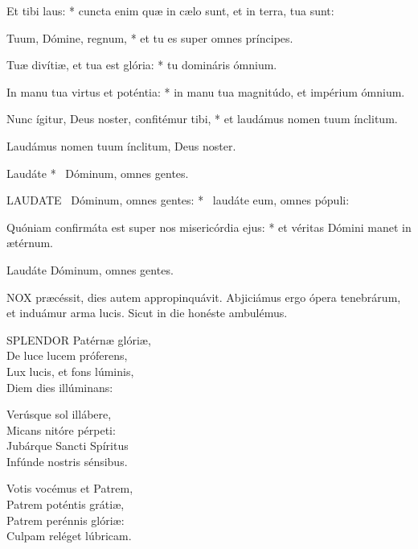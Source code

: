 Et tibi laus: * cuncta enim quæ in cælo sunt, et in terra, tua sunt:

Tuum, Dómine, regnum, * et tu es super omnes príncipes.

Tuæ divítiæ, et tua est glória: * tu domináris ómnium.

In manu tua virtus et poténtia: * in manu tua magnitúdo, et impérium ómnium.

Nunc ígitur, Deus noster, confitémur tibi, * et laudámus nomen tuum ínclitum.

 Laudámus nomen tuum ínclitum, Deus noster.

 Laudáte * \textdagger\ Dóminum, omnes gentes. \textdaggerdbl


\lettrine[lines=2]{L}{AUDATE} \textdagger\ Dóminum, omnes gentes: * \textdaggerdbl\ laudáte eum, omnes pópuli:

Quóniam confirmáta est super nos misericórdia ejus: * et véritas Dómini manet in ætérnum.

 Laudáte Dóminum, omnes gentes.




\lettrine[lines=2]{N}{OX} præcéssit, dies autem appropinquávit. Abjiciámus ergo ópera tenebrárum, et induámur arma lucis. Sicut in die honéste ambulémus.


\lettrine[lines=2]{S}{PLENDOR} Patérnæ glóriæ,\\
De luce lucem próferens,\\
Lux lucis, et fons lúminis,\\
Diem dies illúminans:

Verúsque sol illábere,\\
Micans nitóre pérpeti:\\
Jubárque Sancti Spíritus\\
Infúnde nostris sénsibus.

Votis vocémus et Patrem,\\
Patrem poténtis grátiæ,\\
Patrem perénnis glóriæ:\\
Culpam reléget lúbricam.

